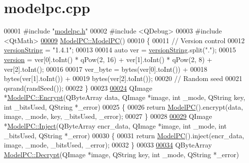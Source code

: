 \hypertarget{modelpc_8cpp_source}{}\section{modelpc.\+cpp}
\label{modelpc_8cpp_source}

\begin{DoxyCode}
00001 \textcolor{preprocessor}{#include "\hyperlink{modelpc_8h}{modelpc.h}"}
00002 \textcolor{preprocessor}{#include <QDebug>}
00003 \textcolor{preprocessor}{#include <QtMath>}
\hypertarget{modelpc_8cpp_source.tex_l00009}{}\hyperlink{class_model_p_c_ae12ebe65ec973c02a0de4850a7c1e31c}{00009} \hyperlink{class_model_p_c_ae12ebe65ec973c02a0de4850a7c1e31c}{ModelPC::ModelPC}()
00010 \{
00011     \textcolor{comment}{// Version control}
00012     \hyperlink{class_model_p_c_a5f426725ccf7eefd3c77ea8c720264c9}{versionString} = \textcolor{stringliteral}{"1.4.1"};
00013 
00014     \textcolor{keyword}{auto} ver = \hyperlink{class_model_p_c_a5f426725ccf7eefd3c77ea8c720264c9}{versionString}.split(\textcolor{stringliteral}{"."});
00015     \hyperlink{class_model_p_c_a5af48ab89e19be42a94c34ba00249401}{version} = ver[0].toInt() * qPow(2, 16) + ver[1].toInt() * qPow(2, 8) + ver[2].toInt();
00016 
00017     ver\_byte = bytes(ver[0].toInt()) +
00018             bytes(ver[1].toInt()) +
00019             bytes(ver[2].toInt());
00020     \textcolor{comment}{// Random seed}
00021     qsrand(randSeed());
00022 \}
00023 
\hypertarget{modelpc_8cpp_source.tex_l00024}{}\hyperlink{class_model_p_c_a271cf9285e32df58ffbfc918e6482bbd}{00024} QImage *\hyperlink{class_model_p_c_a271cf9285e32df58ffbfc918e6482bbd}{ModelPC::Encrypt}(QByteArray data, QImage *image, \textcolor{keywordtype}{int} \_mode, QString key, \textcolor{keywordtype}{int} 
      \_bitsUsed, QString *\_error)
00025 \{
00026     \textcolor{keywordflow}{return} \hyperlink{class_model_p_c_ae12ebe65ec973c02a0de4850a7c1e31c}{ModelPC}().encrypt(data, image, \_mode, key, \_bitsUsed, \_error);
00027 \}
00028 
\hypertarget{modelpc_8cpp_source.tex_l00029}{}\hyperlink{class_model_p_c_ac17e68e6aab134621b0d151d74acdc82}{00029} QImage *\hyperlink{class_model_p_c_ac17e68e6aab134621b0d151d74acdc82}{ModelPC::Inject}(QByteArray encr\_data, QImage *image, \textcolor{keywordtype}{int} \_mode, \textcolor{keywordtype}{int} \_bitsUsed, 
      QString *\_error)
00030 \{
00031     \textcolor{keywordflow}{return} \hyperlink{class_model_p_c_ae12ebe65ec973c02a0de4850a7c1e31c}{ModelPC}().inject(encr\_data, image, \_mode, \_bitsUsed, \_error);
00032 \}
00033 
\hypertarget{modelpc_8cpp_source.tex_l00034}{}\hyperlink{class_model_p_c_a902abaea4f07995b48c0f2fea6eceb7c}{00034} QByteArray \hyperlink{class_model_p_c_a902abaea4f07995b48c0f2fea6eceb7c}{ModelPC::Decrypt}(QImage *image, QString key, \textcolor{keywordtype}{int} \_mode, QString *\_error)

\end{DoxyCode}
